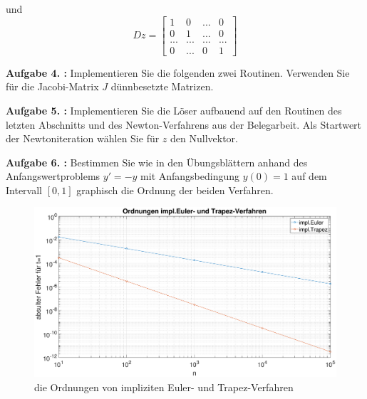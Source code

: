 und 
\begin{equation}
	Dz =
\begin{bmatrix}
	1 & 0 & ... & 0 \\
	0 & 1 & ... & 0 \\
	... & ... & ... & ... \\
	0 & ... & 0 & 1 
\end{bmatrix}  
\end{equation}

\begin{mybox}
	\textbf{Aufgabe 4. :}
	Implementieren Sie die folgenden zwei Routinen. Verwenden Sie für die Jacobi-Matrix $J$ dünnbesetzte
	Matrizen.
\end{mybox}

\begin{figure}[htb]
	
\end{figure}
\begin{figure}[htb]
	
\end{figure}

\begin{mybox}
	\textbf{Aufgabe 5. :}
	Implementieren Sie die Löser aufbauend auf den Routinen des letzten Abschnitts und des Newton-Verfahrens aus der Belegarbeit. Als Startwert der Newtoniteration wählen Sie für $z$ den Nullvektor.
\end{mybox}


\begin{mybox}
	\textbf{Aufgabe 6. :}
	Bestimmen Sie wie in den Übungsblättern anhand des Anfangswertproblems $ y' = -y $ mit Anfangsbedingung $ y(0) = 1 $ auf dem Intervall $ [0,1] $ graphisch die Ordnung der beiden Verfahren.
\end{mybox}

\begin{figure}[h]
	\centering
	\includegraphics[width=1\textwidth]{figures/Impl._3_1_6/Ordnungen_E_T}
	\caption{die Ordnungen von impliziten Euler- und Trapez-Verfahren}
\end{figure}


